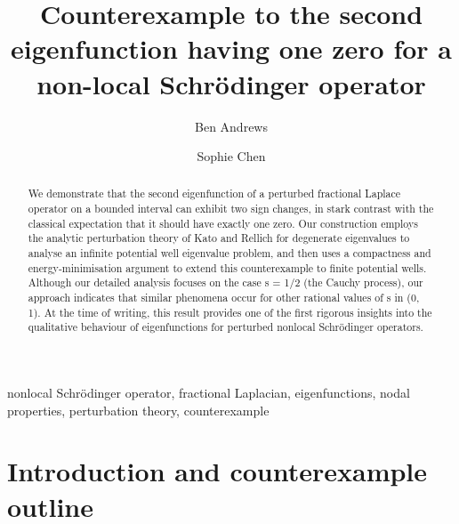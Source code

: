 \documentclass[preprint,12pt]{elsarticle}
\begin{document}
\begin{frontmatter}

\title{Counterexample to the second eigenfunction having one zero for a non-local Schr\"{o}dinger operator}

\author[1]{Ben Andrews}
\author[2, fn1]{Sophie Chen}

\address[1]{Mathematical Sciences Institute, Australian National University, Canberra, Australia}
\address[2]{Mathematical Sciences Institute, Australian National University, Canberra, Australia}


\begin{abstract}
We demonstrate that the second eigenfunction of a perturbed fractional Laplace operator on a bounded interval can exhibit two sign changes, in stark contrast with the classical expectation that it should have exactly one zero. Our construction employs the analytic perturbation theory of Kato and Rellich for degenerate eigenvalues to analyse an infinite potential well eigenvalue problem, and then uses a compactness and energy‐minimisation argument to extend this counterexample to finite potential wells. Although our detailed analysis focuses on the case s = 1/2 (the Cauchy process), our approach indicates that similar phenomena occur for other rational values of s in (0, 1). At the time of writing, this result provides one of the first rigorous insights into the qualitative behaviour of eigenfunctions for perturbed nonlocal Schrödinger operators.
\end{abstract}

\begin{keyword}
nonlocal Schr\"{o}dinger operator, fractional Laplacian, eigenfunctions, nodal properties, perturbation theory, counterexample
\end{keyword}

\end{frontmatter}

%
\section{Introduction and counterexample outline}\label{ch_4_background}
\end{document}
